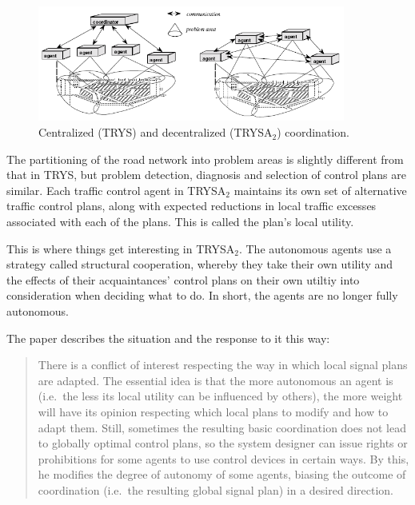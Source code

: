 \documentclass[11pt,letterpaper,onecolumn,twoside,openright,final]{report}
\begin{document}
\begin{figure}[h]
  \includegraphics[width=0.9\textwidth]{figures/TRYS-and-TRYSA2.PNG}
  \caption{Centralized (TRYS) and decentralized (TRYSA$_{2}$) coordination.}
  \label{fig:TRYS-and-TRYSA2}
\end{figure}

The partitioning of the road network into problem areas is slightly different from that in TRYS, but problem detection, diagnosis and selection of control plans are similar.
Each traffic control agent in TRYSA$_{2}$ maintains its own set of alternative traffic control plans, along with expected reductions in local traffic excesses associated with each of the plans.
This is called the plan's local utility.

This is where things get interesting in TRYSA$_{2}$.
The autonomous agents use a strategy called structural cooperation\cite{ossowski1999}, whereby they take their own utility and the effects of their acquaintances' control plans on their own utiltiy into consideration when deciding what to do.
In short, the agents are no longer fully autonomous.

The paper describes the situation and the response to it this way:


\singlespacing
\begin{quote}
There is a conflict of interest respecting the way in which local signal plans are adapted.
The essential idea is that the more autonomous an agent is (i.e.~the less its local utility can be influenced by others), the more weight will have its opinion respecting which local plans to modify and how to adapt them.
Still, sometimes the resulting basic coordination does not lead to globally optimal control plans, so the system designer can issue rights or prohibitions for some agents to use control devices in certain ways.
By this, he modifies the degree of autonomy of some agents, biasing the outcome of coordination (i.e.~the resulting global signal plan) in a desired direction.
\end{quote}
\onehalfspacing
\end{document}
